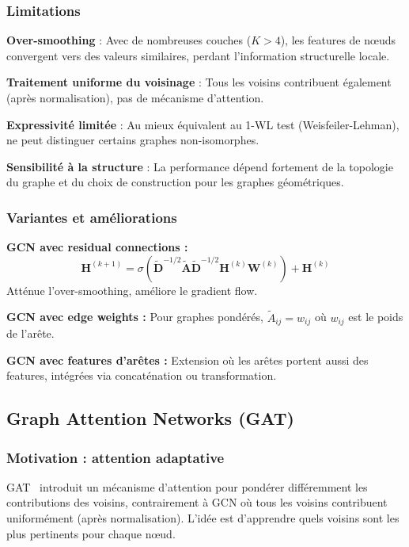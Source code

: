 \subsubsection{Limitations}

\textbf{Over-smoothing} : Avec de nombreuses couches ($K > 4$), les features de nœuds convergent vers des valeurs similaires, perdant l'information structurelle locale.
    
\textbf{Traitement uniforme du voisinage} : Tous les voisins contribuent également (après normalisation), pas de mécanisme d'attention.

\textbf{Expressivité limitée} : Au mieux équivalent au 1-WL test (Weisfeiler-Lehman), ne peut distinguer certains graphes non-isomorphes.

\textbf{Sensibilité à la structure} : La performance dépend fortement de la topologie du graphe et du choix de construction pour les graphes géométriques.

\subsubsection{Variantes et améliorations}

\textbf{GCN avec residual connections :}
\[
\mathbf{H}^{(k+1)} = \sigma\left(\tilde{\mathbf{D}}^{-1/2}\tilde{\mathbf{A}}\tilde{\mathbf{D}}^{-1/2}\mathbf{H}^{(k)}\mathbf{W}^{(k)}\right) + \mathbf{H}^{(k)}
\]
Atténue l'over-smoothing, améliore le gradient flow.

\textbf{GCN avec edge weights :}
Pour graphes pondérés, $\tilde{A}_{ij} = w_{ij}$ où $w_{ij}$ est le poids de l'arête.

\textbf{GCN avec features d'arêtes :}
Extension où les arêtes portent aussi des features, intégrées via concaténation ou transformation.

\subsection{Graph Attention Networks (GAT)}

\subsubsection{Motivation : attention adaptative}

GAT~\cite{Velickovic2018} introduit un mécanisme d'attention pour pondérer différemment les contributions des voisins, contrairement à GCN où tous les voisins contribuent uniformément (après normalisation). L'idée est d'apprendre quels voisins sont les plus pertinents pour chaque nœud.

